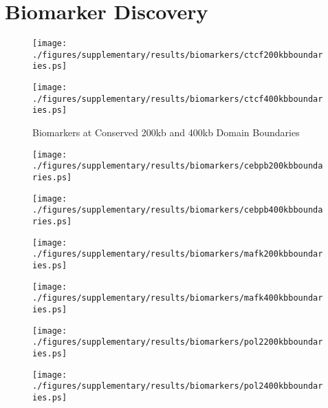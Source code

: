 \newpage
\section*{Biomarker Discovery}

\begin{figure}[H]
  \caption{Biomarkers at Conserved 200kb and 400kb Domain Boundaries}\label{fig:boundaryBiomarkers}
  \begin{minipage}{0.45\textwidth}%
    \texttt{[image: ./figures/supplementary/results/biomarkers/ctcf200kbboundaries.ps]}
  \end{minipage}%
  \hfill
  \begin{minipage}{0.45\textwidth}
    \texttt{[image: ./figures/supplementary/results/biomarkers/ctcf400kbboundaries.ps]}
  \end{minipage}
\end{figure}

\begin{figure}[H]
  \begin{minipage}{0.45\textwidth}%
    \texttt{[image: ./figures/supplementary/results/biomarkers/cebpb200kbboundaries.ps]}
  \end{minipage}%
  \hfill
  \begin{minipage}{0.45\textwidth}
    \texttt{[image: ./figures/supplementary/results/biomarkers/cebpb400kbboundaries.ps]}
  \end{minipage}
\end{figure}

\begin{figure}[H]
  \begin{minipage}{0.45\textwidth}%
    \texttt{[image: ./figures/supplementary/results/biomarkers/mafk200kbboundaries.ps]}
  \end{minipage}%
  \hfill
  \begin{minipage}{0.45\textwidth}
    \texttt{[image: ./figures/supplementary/results/biomarkers/mafk400kbboundaries.ps]}
  \end{minipage}
\end{figure}

\begin{figure}[H]
  \begin{minipage}{0.45\textwidth}%
    \texttt{[image: ./figures/supplementary/results/biomarkers/pol2200kbboundaries.ps]}
  \end{minipage}%
  \hfill
  \begin{minipage}{0.45\textwidth}
    \texttt{[image: ./figures/supplementary/results/biomarkers/pol2400kbboundaries.ps]}
  \end{minipage}
\end{figure}

